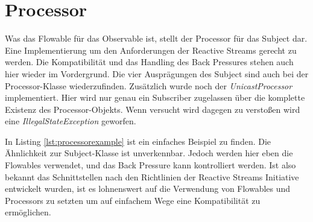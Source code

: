 \section{Processor}
Was das Flowable für das Observable ist, stellt der Processor für das Subject dar. Eine Implementierung um den Anforderungen der Reactive Streams gerecht zu werden. Die Kompatibilität und das Handling des Back Pressures stehen auch hier wieder im Vordergrund. Die vier Ausprägungen des Subject sind auch bei der Processor-Klasse wiederzufinden. Zusätzlich wurde noch der \textit{UnicastProcessor} implementiert. Hier wird nur genau ein Subscriber zugelassen über die komplette Existenz des Processor-Objekts. Wenn versucht wird dagegen zu verstoßen wird eine \textit{IllegalStateException} geworfen.

In Listing \ref{lst:processorexample} ist ein einfaches Beispiel zu finden. Die Ähnlichkeit zur Subject-Klasse ist unverkennbar. Jedoch werden hier eben die Flowables verwendet, und das Back Pressure kann kontrolliert werden. Ist also bekannt das Schnittstellen nach den Richtlinien der Reactive Streams Initiative entwickelt wurden, ist es lohnenswert auf die Verwendung von Flowables und Processors zu setzten um auf einfachem Wege eine Kompatibilität zu ermöglichen.
